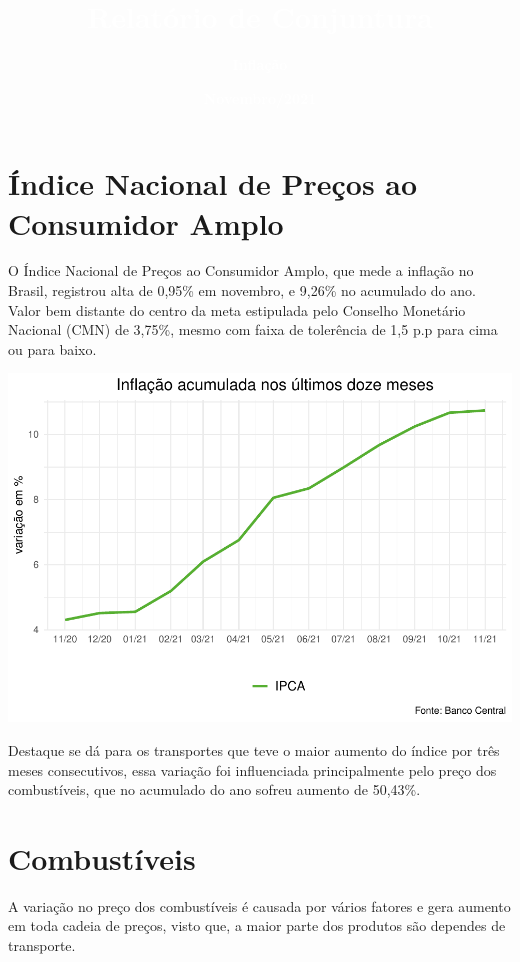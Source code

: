 \documentclass[100,a4paperpaper,]{article}
\title{\textbf{\textcolor{white}{Relatório de Conjuntura}}}
\author{\textbf{\textcolor{white}{Inflação}}}
\date{\textbf{\textcolor{white}{Novembro/2021}}}
\begin{document}
\renewcommand{\contentsname}{Sumário}


\maketitle
\tableofcontents
\clearpage

\section{Índice Nacional de Preços ao Consumidor Amplo} 
 \vspace{0,5cm}

O Índice Nacional de Preços ao Consumidor Amplo, que mede a inflação no
Brasil, registrou alta de 0,95\% em novembro, e 9,26\% no acumulado do
ano. Valor bem distante do centro da meta estipulada pelo Conselho
Monetário Nacional (CMN) de 3,75\%, mesmo com faixa de tolerência de 1,5
p.p para cima ou para baixo.

\includegraphics{inflacao_files/figure-latex/inflacao 12 meses-1.pdf}

Destaque se dá para os transportes que teve o maior aumento do índice
por três meses consecutivos, essa variação foi influenciada
principalmente pelo preço dos combustíveis, que no acumulado do ano
sofreu aumento de 50,43\%. \newpage

\section{Combustíveis} 
 \vspace{0,5cm}

A variação no preço dos combustíveis é causada por vários fatores e gera
aumento em toda cadeia de preços, visto que, a maior parte dos produtos
são dependes de transporte.
\end{document}
